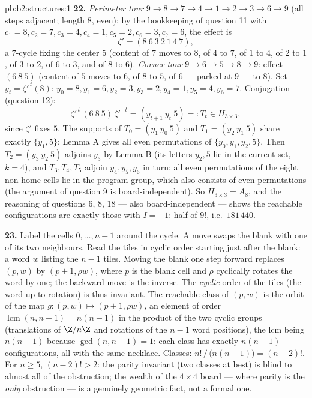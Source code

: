 \begin{solution}{pb:b2:structures:1}
\textbf{22.} \emph{Perimeter tour} $9 \to 8 \to 7 \to 4 \to 1
\to 2 \to 3 \to 6 \to 9$ (all steps adjacent; length $8$, even):
by the bookkeeping of question 11 with $c_1 = 8, c_2 = 7, c_3 =
4, c_4 = 1, c_5 = 2, c_6 = 3, c_7 = 6$, the effect is
\[
\zeta' = (8\ 6\ 3\ 2\ 1\ 4\ 7),
\]
a $7$-cycle fixing the center $5$ (content of $7$ moves to $8$,
of $4$ to $7$, of $1$ to $4$, of $2$ to $1$, of $3$ to $2$, of
$6$ to $3$, and of $8$ to $6$). \emph{Corner tour} $9 \to 6 \to
5 \to 8 \to 9$: effect $(6\ 8\ 5)$ (content of $5$ moves to
$6$, of $8$ to $5$, of $6$ --- parked at $9$ --- to $8$). Set
$y_t = \zeta'^{\,t}(8)$: $y_0 = 8, y_1 = 6, y_2 = 3, y_3 = 2,
y_4 = 1, y_5 = 4, y_6 = 7$. Conjugation (question 12):
\[
\zeta'^{\,t}\,(6\ 8\ 5)\,\zeta'^{-t}
= (y_{t+1}\ y_t\ 5) =: T_t \in H_{3\times3},
\]
since $\zeta'$ fixes $5$. The supports of $T_0 = (y_1\ y_0\ 5)$
and $T_1 = (y_2\ y_1\ 5)$ share exactly $\{y_1, 5\}$: Lemma A
gives all even permutations of $\{y_0, y_1, y_2, 5\}$. Then
$T_2 = (y_3\ y_2\ 5)$ adjoins $y_3$ by Lemma B (its letters
$y_2, 5$ lie in the current set, $k = 4$), and $T_3, T_4, T_5$
adjoin $y_4, y_5, y_6$ in turn: all even permutations of the
eight non-home cells lie in the program group, which also
consists of even permutations (the argument of question 9 is
board-independent). So $H_{3\times3} = A_8$, and the reasoning
of questions 6, 8, 18 --- also board-independent --- shows the
reachable configurations are exactly those with $I = +1$: half
of $9!$, i.e.\ $181\,440$.

\textbf{23.} Label the cells $0, \dots, n-1$ around the cycle.
A move swaps the blank with one of its two neighbours. Read the
tiles in cyclic order starting just after the blank: a word $w$
listing the $n - 1$ tiles. Moving the blank one step forward
replaces $(p, w)$ by $(p + 1, \rho w)$, where $p$ is the blank
cell and $\rho$ cyclically rotates the word by one; the backward
move is the inverse. The \emph{cyclic} order of the tiles (the
word up to rotation) is thus invariant. The reachable class of
$(p, w)$ is the orbit of the map $g \colon (p, w) \mapsto (p+1,
\rho w)$, an element of order $\operatorname{lcm}(n, n-1) =
n(n-1)$ in the product of the two cyclic groups (translations of
$\Z/n\Z$ and rotations of the $n-1$ word positions), the lcm
being $n(n-1)$ because $\gcd(n, n-1) = 1$: each class has
exactly $n(n-1)$ configurations, all with the same necklace.
Classes: $n!\,/\,\bigl(n(n-1)\bigr) = (n-2)!$. For $n \geq 5$,
$(n-2)! > 2$: the parity invariant (two classes at best) is
blind to almost all of the obstruction; the wealth of the $4
\times 4$ board --- where parity is the \emph{only} obstruction
--- is a genuinely geometric fact, not a formal one.


\end{solution}
